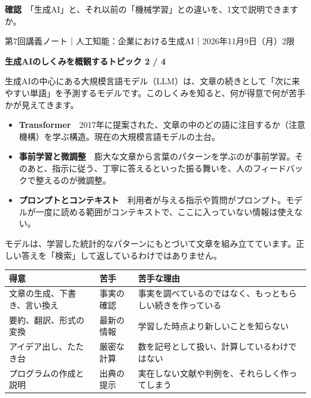 \documentclass[paper=a4paper,fontsize=10pt,line_length=170mm,number_of_lines=46,baselineskip=1.6zw]{jlreq}
\newcommand\topichead[4]{%
  {\sffamily\footnotesize\color{grayt}#1\par}\vspace{1.5mm}
  {\sffamily\bfseries\LARGE #4}\hfill\colorbox{accent}{\sffamily\footnotesize\bfseries トピック #2 / #3}\par
  \vspace{1.2mm}{\color{ink}\hrule height 0.6pt}\vspace{3mm}}
\newcommand\subhead[1]{\par\vspace{2.6mm}{\sffamily\bfseries\large #1}\par\vspace{1.3mm}}
\begin{document}
\begin{checkbox}
{\sffamily\bfseries 確認}　「生成AI」と、それ以前の「機械学習」との違いを、1文で説明できますか。\par
\end{checkbox}
\clearpage
\topichead{第7回講義ノート｜人工知能：企業における生成AI｜2026年11月9日（月）2限}{2}{4}{生成AIのしくみを概観する}
生成AIの中心にある大規模言語モデル（LLM）は、文章の続きとして「次に来やすい単語」を予測するモデルです。このしくみを知ると、何が得意で何が苦手かが見えてきます。\par\vspace{1.2mm}
\subhead{基本の用語}
\begin{itemize}[leftmargin=1.5em,itemsep=0.6mm,topsep=0.3mm]
\item {\sffamily\bfseries Transformer}　2017年に提案された、文章の中のどの語に注目するか（注意機構）を学ぶ構造。現在の大規模言語モデルの土台。
\item {\sffamily\bfseries 事前学習と微調整}　膨大な文章から言葉のパターンを学ぶのが事前学習。そのあと、指示に従う、丁寧に答えるといった振る舞いを、人のフィードバックで整えるのが微調整。
\item {\sffamily\bfseries プロンプトとコンテキスト}　利用者が与える指示や質問がプロンプト。モデルが一度に読める範囲がコンテキストで、ここに入っていない情報は使えない。
\end{itemize}\vspace{0.8mm}
モデルは、学習した統計的なパターンにもとづいて文章を組み立てています。正しい答えを「検索」して返しているわけではありません。\par\vspace{1.2mm}
\subhead{得意なことと苦手なこと}
\begin{center}\small\renewcommand{\arraystretch}{1.15}\setlength{\tabcolsep}{1.5mm}
\begin{tabular}{|p{24.0mm}|p{68.0mm}|p{68.0mm}|}\arrayrulecolor{rulec}\hline
\rowcolor{papertwo}\sffamily\bfseries 得意 & \sffamily\bfseries 苦手 & \sffamily\bfseries 苦手な理由\\\hline
文章の生成、下書き、言い換え & 事実の確認 & 事実を調べているのではなく、もっともらしい続きを作っている\\\hline
要約、翻訳、形式の変換 & 最新の情報 & 学習した時点より新しいことを知らない\\\hline
アイデア出し、たたき台 & 厳密な計算 & 数を記号として扱い、計算しているわけではない\\\hline
プログラムの作成と説明 & 出典の提示 & 実在しない文献や判例を、それらしく作ってしまう\\\hline
\end{tabular}\end{center}\vspace{0.5mm}
\end{document}
